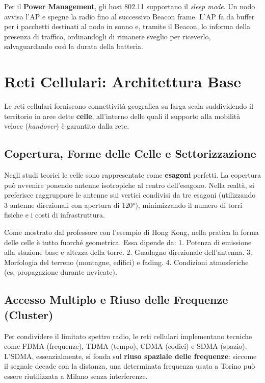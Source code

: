 Per il \textbf{Power Management}, gli host 802.11 supportano il \textit{sleep mode}. Un nodo avvisa l'AP e spegne la radio fino al successivo Beacon frame. L'AP fa da buffer per i pacchetti destinati al nodo in sonno e, tramite il Beacon, lo informa della presenza di traffico, ordinandogli di rimanere sveglio per riceverlo, salvaguardando così la durata della batteria.

\section{Reti Cellulari: Architettura Base}
Le reti cellulari forniscono connettività geografica su larga scala suddividendo il territorio in aree dette \textbf{celle}, all'interno delle quali il supporto alla mobilità veloce (\textit{handover}) è garantito dalla rete.

\subsection{Copertura, Forme delle Celle e Settorizzazione}
Negli studi teorici le celle sono rappresentate come \textbf{esagoni} perfetti. 
La copertura può avvenire ponendo antenne isotropiche al centro dell'esagono. Nella realtà, si preferisce raggruppare le antenne sui vertici condivisi da tre esagoni (utilizzando 3 antenne direzionali con apertura di 120°), minimizzando il numero di torri fisiche e i costi di infrastruttura.

\begin{remark}
Come mostrato dal professore con l'esempio di Hong Kong, nella pratica la forma delle celle è tutto fuorché geometrica. Essa dipende da:
1. Potenza di emissione alla stazione base e altezza della torre.
2. Guadagno direzionale dell'antenna.
3. Morfologia del terreno (montagne, edifici) e fading.
4. Condizioni atmosferiche (es. propagazione durante nevicate).
\end{remark}

\subsection{Accesso Multiplo e Riuso delle Frequenze (Cluster)}
Per condividere il limitato spettro radio, le reti cellulari implementano tecniche come FDMA (frequenze), TDMA (tempo), CDMA (codici) e SDMA (spazio).
L'SDMA, essenzialmente, si fonda sul \textbf{riuso spaziale delle frequenze}: siccome il segnale decade con la distanza, una determinata frequenza usata a Torino può essere riutilizzata a Milano senza interferenze.

